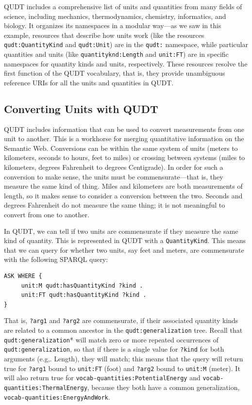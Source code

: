 QUDT includes a comprehensive list of units and quantities from many
fields of science, including mechanics, thermodynamics, chemistry,
informatics, and biology. It organizes its namespaces in a modular
way---as we saw in this example, resources that describe how units work
(like the resources \texttt{qudt:QuantityKind} and \texttt{qudt:Unit}) are in the \texttt{qudt:}
namespace, while particular quantities and units (like
\texttt{quantityknd:Length} and \texttt{unit:FT}) are in specific namespaces
for quantity kinds and units, respectively. 
These resources resolve the first function of the QUDT vocabulary, that
is, they provide unambiguous reference URIs for all the units and
quantities in QUDT.

\subsection{Converting Units with QUDT}

QUDT includes information that can be used to convert measurements from
one unit to another. This is a workhorse for merging quantitative
information on the Semantic Web. Conversions can be within the same
system of units (meters to kilometers, seconds to hours, feet to miles)
or crossing between systems (miles to kilometers, degrees Fahrenheit to
degrees Centigrade). In order for such a conversion to make sense, the
units must be commensurate---that is, they measure the same kind of
thing. Miles and kilometers are both measurements of length, so it makes
sense to consider a conversion between the two. Seconds and degrees
Fahrenheit do not measure the same thing; it is not meaningful to
convert from one to another.

In QUDT, we can tell if two units are commensurate if they measure the same
kind of quantity.  This is represented in QUDT with a \texttt{QuantityKind}.  
This means that we can query for whether two units, say feet and meters,  are commensurate with
the following SPARQL
query:

\begin{lstlisting}
ASK WHERE {
     unit:M qudt:hasQuantityKind ?kind .
     unit:FT qudt:hasQuantityKind ?kind .
}
\end{lstlisting}


That is, \texttt{?arg1} and \texttt{?arg2} are commensurate, if their associated quantity
kinds are related to a common ancestor in the \texttt{qudt:generalization} tree.
Recall that \texttt{qudt:generalization}* will match zero or more repeated
occurrences of \texttt{qudt:generalization}, so that if there is a single value for  \texttt{?kind} 
for both arguments (e.g,. Length), they will match; this means that the query
will return true for \texttt{?arg1} bound to \texttt{unit:FT} (foot) and \texttt{?arg2} bound to
\texttt{unit:M} (meter). It will also return true for
\texttt{vocab-quantities:PotentialEnergy} and \texttt{vocab-quantities:ThermalEnergy},
because they both have a common generalization,
\texttt{vocab-quantities:EnergyAndWork}.

